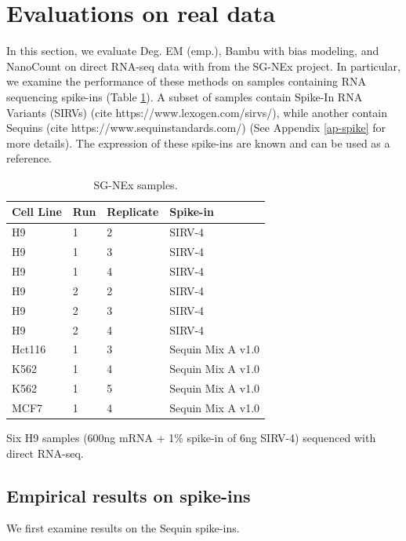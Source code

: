 \section{Evaluations on real data}

In this section, we evaluate Deg. EM (emp.), Bambu with bias modeling, and NanoCount on direct RNA-seq data with  from the SG-NEx project. In particular, we examine the performance of these methods on samples containing RNA sequencing spike-ins (Table \ref{tab-sgnex}). A subset of samples contain Spike-In RNA Variants (SIRVs) (cite https://www.lexogen.com/sirvs/), while another contain Sequins (cite https://www.sequinstandards.com/) (See Appendix \ref{ap-spike} for more details). The expression of these spike-ins are known and can be used as a reference.   

\begin{table}[htbp]
  \centering
    \begin{tabular}{|p{2cm}|p{2cm}|p{2cm}|p{3.5cm}|}
    \hline
    Cell Line & Run & Replicate   & Spike-in \bigstrut\\
    \hline
    H9    & 1     & 2     & SIRV-4 \bigstrut\\
    \hline
    H9    & 1     & 3     & SIRV-4 \bigstrut\\
    \hline
    H9    & 1     & 4     & SIRV-4 \bigstrut\\
    \hline
    H9    & 2     & 2     & SIRV-4 \bigstrut\\
    \hline
    H9    & 2     & 3     & SIRV-4 \bigstrut\\
    \hline
    H9    & 2     & 4     & SIRV-4 \bigstrut\\
    \hline
    Hct116 & 1     & 3     & Sequin Mix A v1.0 \bigstrut\\
    \hline
    K562  & 1     & 4     & Sequin Mix A v1.0 \bigstrut\\
    \hline
    K562  & 1     & 5   & Sequin Mix A v1.0 \bigstrut\\
    \hline
    MCF7  & 1     & 4     & Sequin Mix A v1.0 \bigstrut\\
    \hline
    \end{tabular}%
  \caption[Description of SG-NEx direct RNA-seq samples.]{SG-NEx samples.}
  \label{tab-sgnex}
\end{table}%

Six H9 samples (600ng mRNA + 1\% spike-in of 6ng SIRV-4) sequenced with direct RNA-seq.

\subsection{Empirical results on spike-ins}

We first examine results on the Sequin spike-ins. 

